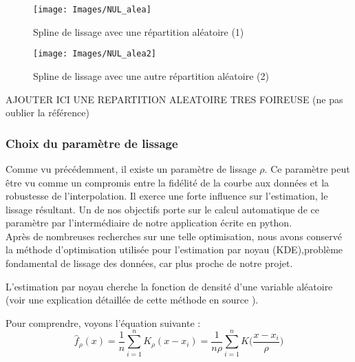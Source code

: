 \documentclass[a4paper,12pt]{article} %
\begin{document}
                \begin{figure}[H]
                \begin{center}
                \texttt{[image: Images/NUL\_alea]} 
                \end{center}
                \caption{Spline de lissage avec une répartition aléatoire (1)}
                \label{alea1}
                \end{figure}
                
                
                \begin{figure}[H]
                \begin{center}
                \texttt{[image: Images/NUL\_alea2]} 
                \end{center}
                \caption{Spline de lissage avec une autre répartition aléatoire (2)}
                \label{alea2}
                \end{figure}
                
            AJOUTER ICI UNE REPARTITION ALEATOIRE TRES FOIREUSE (ne pas oublier la référence)
            
			\subsubsection{Choix du paramètre de lissage}
                Comme vu précédemment, il existe un paramètre de lissage $\rho$. Ce paramètre peut être vu comme un compromis entre la fidélité de la courbe aux données et la robustesse de l'interpolation. Il exerce une forte influence sur l'estimation, le lissage résultant. Un de nos objectifs porte sur le calcul automatique de ce paramètre par l'intermédiaire de notre application écrite en python.\\
                
                Après de nombreuses recherches sur une telle optimisation, nous avons conservé la méthode d'optimisation utilisée pour l'estimation par noyau (KDE),problème fondamental de lissage des données, car plus proche de notre projet. 
                
                L'estimation par noyau cherche la fonction de densité d'une variable aléatoire (voir une explication détaillée de cette méthode en source \cite{Estimation_par_noyau}).
                
                Pour comprendre, voyons l'équation suivante :
                \[{\widehat{f}}_{\rho}(x)={\frac {1}{n}}\sum _{i=1}^{n}K_{\rho}(x-x_{i})={\frac {1}{n\rho}}\sum _{i=1}^{n}K{\Big (}{\frac {x-x_{i}}{\rho}}\Big )\]
                
\end{document}
